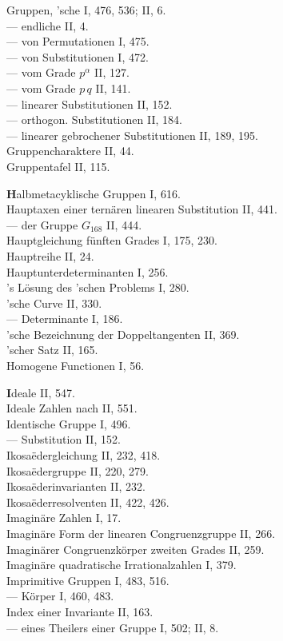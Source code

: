 
\noindent
Gruppen, 'sche I, 476, 536; II, 6.\\
--- endliche II, 4.\\
--- von Permutationen I, 475.\\
--- von Substitutionen I, 472.\\
--- vom Grade $p^{\alpha}$ II, 127.\\
--- vom Grade $p\,q$ II, 141.\\
--- linearer Substitutionen II, 152.\\
--- orthogon. Substitutionen II, 184.\\
--- linearer gebrochener Substitutionen II, 189, 195.\\
Gruppencharaktere II, 44.\\
Gruppentafel II, 115.

\medskip
\noindent
\textbf{H}albmetacyklische Gruppen I, 616.\\
Hauptaxen einer ternären linearen Substitution II, 441.\\
--- der Gruppe $G_{168}$ II, 444.\\
Hauptgleichung fünften Grades I, 175, 230.\\
Hauptreihe II, 24.\\
Hauptunterdeterminanten I, 256.\\
's Lösung des 'schen Problems I, 280.\\
'sche Curve II, 330.\\
--- Determinante I, 186.\\
'sche Bezeichnung der Doppeltangenten II, 369.\\
'scher Satz II, 165.\\
Homogene Functionen I, 56.

\medskip
\noindent
\textbf{I}deale II, 547.\\
Ideale Zahlen nach  II, 551.\\
Identische Gruppe I, 496.\\
--- Substitution II, 152.\\
Ikosa\"edergleichung II, 232, 418.\\
Ikosa\"edergruppe II, 220, 279.\\
Ikosa\"ederinvarianten II, 232.\\
Ikosa\"ederresolventen II, 422, 426.\\
Imaginäre Zahlen I, 17.\\
Imaginäre Form der linearen Congruenzgruppe II, 266.\\
Imaginärer Congruenzkörper zweiten Grades II, 259.\\
Imaginäre quadratische Irrationalzahlen I, 379.\\
Imprimitive Gruppen I, 483, 516.\\
--- Körper I, 460, 483.\\
Index einer Invariante II, 163.\\
--- eines Theilers einer Gruppe I, 502; II, 8.

